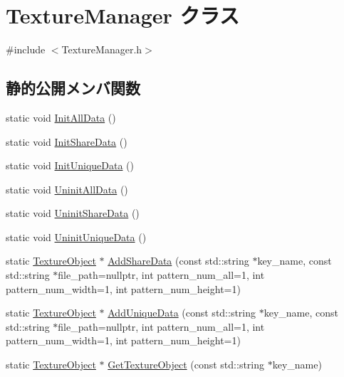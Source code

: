 \hypertarget{class_texture_manager}{}\section{Texture\+Manager クラス}
\label{class_texture_manager}


{\ttfamily \#include $<$Texture\+Manager.\+h$>$}

\subsection*{静的公開メンバ関数}
\begin{DoxyCompactItemize}
\item 
static void \mbox{\hyperlink{class_texture_manager_aee4c784f3f32bfe810bf66313735dece}{Init\+All\+Data}} ()
\item 
static void \mbox{\hyperlink{class_texture_manager_aed1e9666d0ef8698db754280a1d4bad4}{Init\+Share\+Data}} ()
\item 
static void \mbox{\hyperlink{class_texture_manager_abfba2c4293e692a351d9b98e28f6ed31}{Init\+Unique\+Data}} ()
\item 
static void \mbox{\hyperlink{class_texture_manager_a5e81df5cd89e7794fb9230357663a729}{Uninit\+All\+Data}} ()
\item 
static void \mbox{\hyperlink{class_texture_manager_a770b76a28bac4c20c16960f58a2d3b77}{Uninit\+Share\+Data}} ()
\item 
static void \mbox{\hyperlink{class_texture_manager_a9d9dd61edf4153bd70ba830ae2dc62e8}{Uninit\+Unique\+Data}} ()
\item 
static \mbox{\hyperlink{class_texture_object}{Texture\+Object}} $\ast$ \mbox{\hyperlink{class_texture_manager_a571c5b288fe16c53965f45d8bd7c8769}{Add\+Share\+Data}} (const std\+::string $\ast$key\+\_\+name, const std\+::string $\ast$file\+\_\+path=nullptr, int pattern\+\_\+num\+\_\+all=1, int pattern\+\_\+num\+\_\+width=1, int pattern\+\_\+num\+\_\+height=1)
\item 
static \mbox{\hyperlink{class_texture_object}{Texture\+Object}} $\ast$ \mbox{\hyperlink{class_texture_manager_af86003fd2afaf09f0295745d486e42e4}{Add\+Unique\+Data}} (const std\+::string $\ast$key\+\_\+name, const std\+::string $\ast$file\+\_\+path=nullptr, int pattern\+\_\+num\+\_\+all=1, int pattern\+\_\+num\+\_\+width=1, int pattern\+\_\+num\+\_\+height=1)
\item 
static \mbox{\hyperlink{class_texture_object}{Texture\+Object}} $\ast$ \mbox{\hyperlink{class_texture_manager_a18d1f3418511075804f9d11cff1010ff}{Get\+Texture\+Object}} (const std\+::string $\ast$key\+\_\+name)
\end{DoxyCompactItemize}
